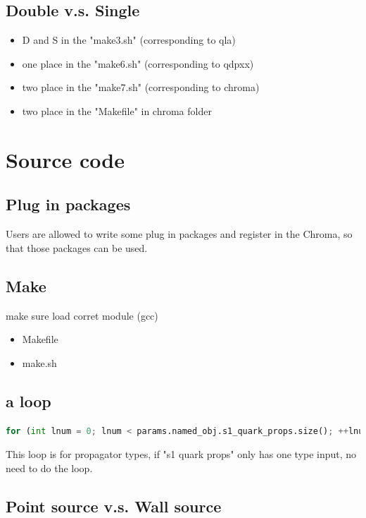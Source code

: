 \documentclass{article}
\begin{document}
\subsection{Double v.s. Single}

\begin{itemize}
  \item D and S in the "make3.sh" (corresponding to qla)
  \item one place in the "make6.sh" (corresponding to qdpxx)
  \item two place in the "make7.sh" (corresponding to chroma)
  \item two place in the "Makefile" in chroma folder
\end{itemize}

\section{Source code}

\subsection{Plug in packages}

Users are allowed to write some plug in packages and register in the Chroma, so that those packages can be used.

\subsection{Make}

make sure load corret module (gcc)

\begin{itemize}
    \item Makefile
    \item make.sh 
\end{itemize}


\subsection{a loop}

\begin{lstlisting}[language=Python]
for (int lnum = 0; lnum < params.named_obj.s1_quark_props.size(); ++lnum)
\end{lstlisting}

This loop is for propagator types, if "s1 quark props" only has one type input, no need to do the loop.

\subsection{Point source v.s. Wall source}
\end{document}
